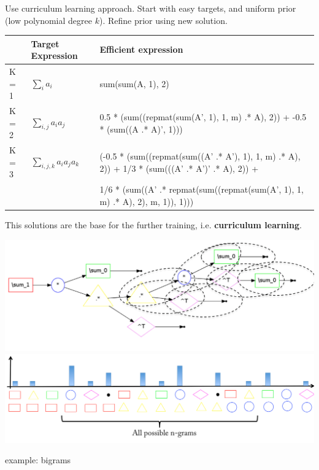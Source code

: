 \documentclass[landscape,a0b]{a0poster_csml_v2}
\begin{document}
\begin{poster}
\begin{PosterColumn}
Use curriculum learning approach.
Start with easy targets, and uniform prior (low polynomial degree $k$). 
Refine prior using new solution.
\vspace{0.5cm}
\\
\begin{minipage}[hc]{\textwidth}
  \begin{center}
    \begin{tabular}{lll}
      \hline
        & Target Expression & Efficient expression \\
      \hline
      K = 1 \hspace{1cm} & $\sum_i a_i \hspace{1cm} $ & {\footnotesize sum(sum(A, 1), 2)} \\
      \hline
      K = 2 & $\sum_{i,j} a_ia_j $ & {\footnotesize 0.5 * (sum((repmat(sum(A', 1), 1, m) .* A), 2)) + -0.5 * (sum((A .* A)', 1)))} \\
      \hline
      K = 3 & $\sum_{i, j, k}a_ia_ja_k$ & {\footnotesize (-0.5 * (sum((repmat(sum((A' .* A'), 1), 1, m) .* A), 2)) + 1/3 * (sum(((A' .* A')' .* A), 2)) +} \\
      & & {\footnotesize 1/6 * (sum((A' .* repmat(sum((repmat(sum(A', 1), 1, m) .* A), 2), m, 1)), 1)))} \\
      \hline
    \end{tabular}
  \end{center}
  \begin{center}
    This solutions are the base for the further training, i.e. {\bf curriculum learning}.
  \end{center}
\end{minipage}
\vspace{0.2cm}

\begin{minipage}[hc]{\textwidth}
  \centering
  \includegraphics[width=0.40\linewidth]{imgs/bigram.png}
  \hfill
  \includegraphics[width=0.40\linewidth]{imgs/histogram.png}
\end{minipage}
\begin{center}
  example: bigrams
\end{center}
\end{PosterColumn}
\begin{PosterColumn} 


\end{PosterColumn}
\end{poster}
\end{document}

